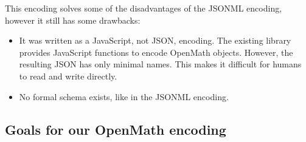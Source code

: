 This encoding solves some of the disadvantages of the JSONML encoding, however it still has some drawbacks:

\begin{itemize}
    \item It was written as a JavaScript, not JSON, encoding.
    The existing library provides JavaScript functions to encode OpenMath objects. 
    However, the resulting JSON has only minimal names. 
    This makes it difficult for humans to read and write directly. 

    \item No formal schema exists, like in the JSONML encoding. 
\end{itemize}

\subsection{Goals for our OpenMath encoding}